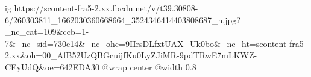  
 
 
 
 

\ifcmt
  ig https://scontent-fra5-2.xx.fbcdn.net/v/t39.30808-6/260303811_1662030360668664_3524346414403808687_n.jpg?_nc_cat=109&ccb=1-7&_nc_sid=730e14&_nc_ohc=9IIrsDLfxtUAX_Uk0bo&_nc_ht=scontent-fra5-2.xx&oh=00_AfB52UzQBGcuijfKu0LyZJiMR-9pdTRwE7mLKWZ-CEyUdQ&oe=642EDA30
  @wrap center
  @width 0.8
\fi

